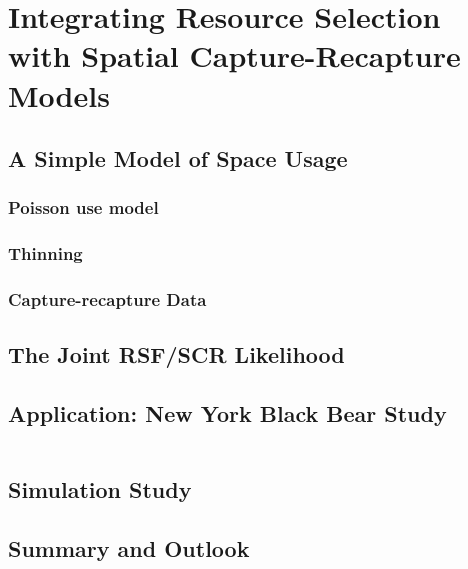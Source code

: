 \chapter{
Integrating Resource Selection with
Spatial Capture-Recapture
  Models}

\label{chapt.rsf}


\section{A Simple Model of Space Usage}
\label{rsf.sec.rsfmodel}


\begin{figure}
\centering
\label{rsf.fig.habitat}
\end{figure}


\begin{figure}
\centering
\label{rsf.fig.homeranges}
\end{figure}


\subsection{Poisson use model}



\subsection{Thinning}



\subsection{Capture-recapture Data}


\section{The Joint RSF/SCR Likelihood}


\section{Application: New York Black Bear Study}
\label{rsf.chapt.nybears}


\begin{table}
\centering
\begin{tabular}{c|rrrrrr}
\hline \hline
\hline
\end{tabular}
\label{tab.nyresults}
\end{table}


\section{Simulation Study}



\section{Summary and Outlook}






















